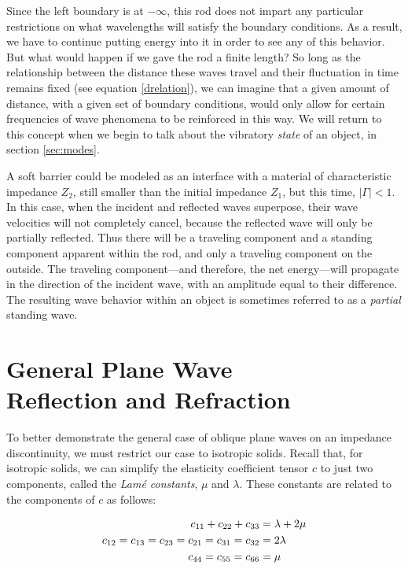 \documentclass[a4paper,10pt]{report}
\numberwithin{equation}{section}
\begin{document}
Since the left boundary is at $-\infty$, this rod does not impart any particular restrictions on what wavelengths will satisfy the boundary conditions. As a result, we have to continue putting energy into it in order to see any of this behavior. \cite[p.319]{Cremer1973} But what would happen if we gave the rod a finite length? So long as the relationship between the distance these waves travel and their fluctuation in time 
remains fixed (see equation \eqref{drelation}), we can imagine that a given amount of distance, with a given set of boundary conditions, would only allow for certain frequencies of wave phenomena to be reinforced in this way. We will return to this concept when we begin to talk about the vibratory \emph{state} of an object, in section \ref{sec:modes}.

A soft barrier could be modeled as an interface with a material of characteristic impedance $Z_2$, still smaller than the initial impedance $Z_1$, but this time, $|\Gamma| < 1$. In this case, when the incident and reflected waves superpose, their wave velocities will not completely cancel, because the reflected wave will only be partially reflected. Thus there will be a traveling component and a standing component apparent within the rod, and only a traveling component on the outside. The traveling component---and therefore, the net energy---will propagate in the direction of the incident wave, with an amplitude equal to their difference. The resulting wave behavior within an object is sometimes referred to as a \emph{partial} standing wave. \cite[p.~275]{Hecht1987}

\section{General Plane Wave \\ Reflection and Refraction}\label{sec:refrac}
To better demonstrate the general case of oblique plane waves on an impedance discontinuity, we must restrict our case to isotropic solids. Recall that, for isotropic solids, we can simplify the elasticity coefficient tensor $c$ to just two components, called the \emph{Lam\'{e} constants}, $\mu$ and $\lambda$. These constants are related to the components of $c$ as follows\cite[p.~95]{Kino1987}:
\begin{singlespace}
\begin{align}\label{lame}
c_{11} + c_{22} + c_{33} &= \lambda + 2\mu \notag\\
c_{12} = c_{13} = c_{23} = c_{21} = c_{31} = c_{32} &= 2\lambda\\
c_{44} = c_{55} = c_{66} &= \mu\notag
\end{align}
\end{singlespace}
\end{document}
